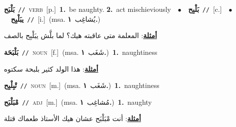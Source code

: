 \documentclass[10pt,a4paper,twoside]{article} %
\begin{document}
\begin{multicols}{2}
{\setlength\topsep{0pt}\textbf{\foreignlanguage{arabic}{بَلْبَح}}\ {\color{gray}\texttt{//}\color{black}}\ \textsc{verb}\ [p.]\ \textbf{1.}~be naughty.  \textbf{2.}~act mischieviously\ \ $\bullet$\ \ \setlength\topsep{0pt}\textbf{\foreignlanguage{arabic}{بَلْبِح}}\ {\color{gray}\texttt{//}\color{black}}\ [c.]\ \ $\bullet$\ \ \setlength\topsep{0pt}\textbf{\foreignlanguage{arabic}{يبَلْبِح}}\ {\color{gray}\texttt{//}\color{black}}\ [i.]\ \color{gray}(msa. \foreignlanguage{arabic}{يُشاغِب}~\foreignlanguage{arabic}{\textbf{١.}})\color{black}\  \begin{flushright}\color{gray}\foreignlanguage{arabic}{\textbf{\underline{\foreignlanguage{arabic}{أمثلة}}}: المعلمة متى عاقبته هيك؟ لما بلَّش يبَلْبِح بالصف}\end{flushright}\color{black}} \vspace{2mm}

{\setlength\topsep{0pt}\textbf{\foreignlanguage{arabic}{بَلْبَحَة}}\ {\color{gray}\texttt{//}\color{black}}\ \textsc{noun}\ [f.]\ \color{gray}(msa. \foreignlanguage{arabic}{شَغَب}~\foreignlanguage{arabic}{\textbf{١.}})\color{black}\ \textbf{1.}~naughtiness\  \begin{flushright}\color{gray}\foreignlanguage{arabic}{\textbf{\underline{\foreignlanguage{arabic}{أمثلة}}}: هذا الولد كثير بلبحة سكتوه}\end{flushright}\color{black}} \vspace{2mm}

{\setlength\topsep{0pt}\textbf{\foreignlanguage{arabic}{تْبِلْبِح}}\ {\color{gray}\texttt{//}\color{black}}\ \textsc{noun}\ [m.]\ \color{gray}(msa. \foreignlanguage{arabic}{شَغَب}~\foreignlanguage{arabic}{\textbf{١.}})\color{black}\ \textbf{1.}~naughtiness\ } \vspace{2mm}

{\setlength\topsep{0pt}\textbf{\foreignlanguage{arabic}{مْبَلْبَح}}\ {\color{gray}\texttt{//}\color{black}}\ \textsc{adj}\ [m.]\ \color{gray}(msa. \foreignlanguage{arabic}{مُشاغِب}~\foreignlanguage{arabic}{\textbf{١.}})\color{black}\ \textbf{1.}~naughty\  \begin{flushright}\color{gray}\foreignlanguage{arabic}{\textbf{\underline{\foreignlanguage{arabic}{أمثلة}}}: أنت مْبَلْبَح عشان هيك الأستاذ طعماك قتلة}\end{flushright}\color{black}} \vspace{2mm}


\end{multicols}
\end{document}
